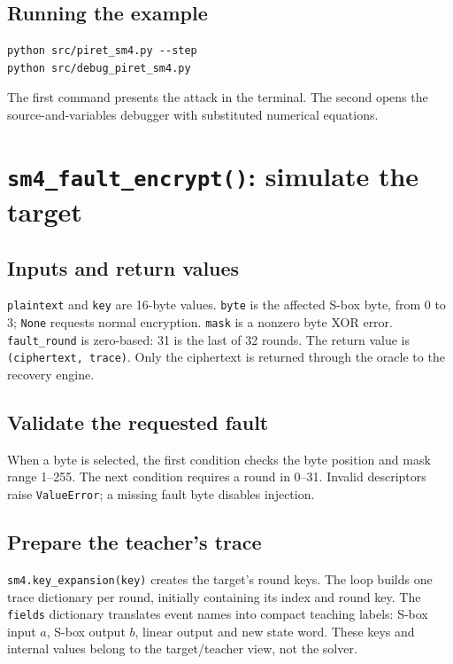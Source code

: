 \documentclass[11pt,a4paper]{article}
\newcommand{\hx}[1]{\texttt{#1}}
\begin{document}
\subsection{Running the example}
\begin{Verbatim}
python src/piret_sm4.py --step
python src/debug_piret_sm4.py
\end{Verbatim}
The first command presents the attack in the terminal. The second opens the
source-and-variables debugger with substituted numerical equations.

\section{\texorpdfstring{\texttt{sm4\_fault\_encrypt()}}{sm4_fault_encrypt}: simulate the target}
\subsection{Inputs and return values}
\hx{plaintext} and \hx{key} are 16-byte values. \hx{byte} is the affected S-box
byte, from 0 to 3; \hx{None} requests normal encryption. \hx{mask} is a nonzero
byte XOR error. \hx{fault\_round} is zero-based: 31 is the last of 32 rounds.
The return value is \hx{(ciphertext, trace)}. Only the ciphertext is returned
through the oracle to the recovery engine.

\subsection{Validate the requested fault}
When a byte is selected, the first condition checks the byte position and mask
range 1--255. The next condition requires a round in 0--31. Invalid descriptors
raise \hx{ValueError}; a missing fault byte disables injection.

\subsection{Prepare the teacher's trace}
\hx{sm4.key\_expansion(key)} creates the target's round keys. The loop builds one
trace dictionary per round, initially containing its index and round key.
The \hx{fields} dictionary translates event names into compact teaching labels:
S-box input $a$, S-box output $b$, linear output and new state word.
These keys and internal values belong to the target/teacher view, not the solver.
\end{document}

